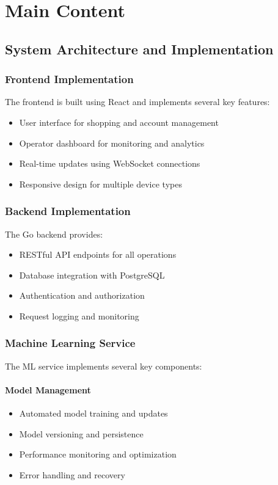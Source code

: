 \documentclass[12pt]{article}
\begin{document}
\section{Main Content}

\subsection{System Architecture and Implementation}
\subsubsection{Frontend Implementation}
The frontend is built using React and implements several key features:
\begin{itemize}
    \item User interface for shopping and account management
    \item Operator dashboard for monitoring and analytics
    \item Real-time updates using WebSocket connections
    \item Responsive design for multiple device types
\end{itemize}

\subsubsection{Backend Implementation}
The Go backend provides:
\begin{itemize}
    \item RESTful API endpoints for all operations
    \item Database integration with PostgreSQL
    \item Authentication and authorization
    \item Request logging and monitoring
\end{itemize}

\subsubsection{Machine Learning Service}
The ML service implements several key components:

\paragraph{Model Management}
\begin{itemize}
    \item Automated model training and updates
    \item Model versioning and persistence
    \item Performance monitoring and optimization
    \item Error handling and recovery
\end{itemize}
\end{document}
